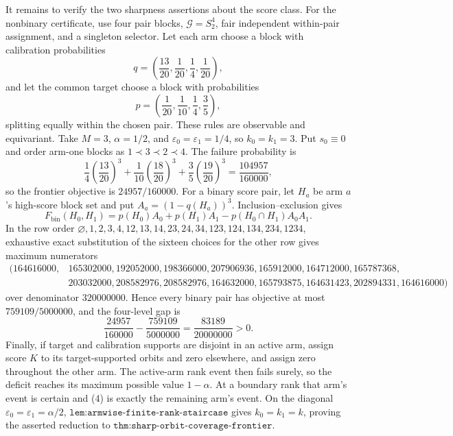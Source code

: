 It remains to verify the two sharpness assertions about the score class. For the nonbinary certificate, use four pair blocks, \(\mathcal G=S_2^4\), fair independent within-pair assignment, and a singleton selector. Let each arm choose a block with calibration probabilities
\[q=\left(\frac{13}{20},\frac1{20},\frac14,\frac1{20}\right),\]
and let the common target choose a block with probabilities
\[p=\left(\frac1{20},\frac1{10},\frac14,\frac35\right),\]
splitting equally within the chosen pair. These rules are observable and equivariant. Take \(M=3\), \(\alpha=1/2\), and \(\varepsilon_0=\varepsilon_1=1/4\), so \(k_0=k_1=3\). Put \(s_0\equiv0\) and order arm-one blocks as \(1\prec3\prec2\prec4\). The failure probability is
\[\frac14\left(\frac{13}{20}\right)^3+\frac1{10}\left(\frac{18}{20}\right)^3+\frac35\left(\frac{19}{20}\right)^3=\frac{104957}{160000},\]
so the frontier objective is \(24957/160000\). For a binary score pair, let \(H_a\) be arm \(a\)'s high-score block set and put \(A_a=(1-q(H_a))^3\). Inclusion--exclusion gives
\[F_{\mathrm{bin}}(H_0,H_1)=p(H_0)A_0+p(H_1)A_1-p(H_0\cap H_1)A_0A_1.\tag{7}\]
In the row order \(\varnothing,1,2,3,4,12,13,14,23,24,34,123,124,134,234,1234\), exhaustive exact substitution of the sixteen choices for the other row gives maximum numerators
\[\begin{split}(164616000,&165302000,192052000,198366000,207906936,165912000,164712000,165787368,\\&203032000,208582976,208582976,164632000,165793875,164631423,202894331,164616000)\end{split}\]
over denominator \(320000000\). Hence every binary pair has objective at most \(759109/5000000\), and the four-level gap is
\[\frac{24957}{160000}-\frac{759109}{5000000}=\frac{83189}{20000000}>0.\tag{8}\]
Finally, if target and calibration supports are disjoint in an active arm, assign score \(K\) to its target-supported orbits and zero elsewhere, and assign zero throughout the other arm. The active-arm rank event then fails surely, so the deficit reaches its maximum possible value \(1-\alpha\). At a boundary rank that arm's event is certain and (4) is exactly the remaining arm's event. On the diagonal \(\varepsilon_0=\varepsilon_1=\alpha/2\), \(\texttt{lem:armwise-finite-rank-staircase}\) gives \(k_0=k_1=k\), proving the asserted reduction to \(\texttt{thm:sharp-orbit-coverage-frontier}\).